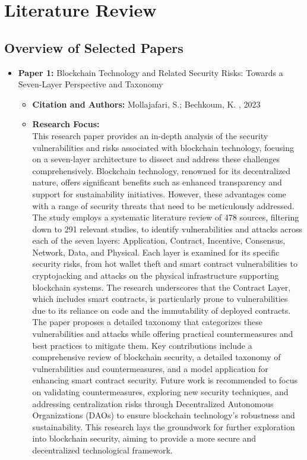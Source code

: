 \documentclass[12pt,a4paper]{article}
\begin{document}
\section{Literature Review}

\subsection{Overview of Selected Papers}
\begin{itemize}
    \item \textbf{Paper 1:} Blockchain Technology and Related Security Risks: Towards a Seven-Layer Perspective and Taxonomy
    \begin{itemize}
        \item \textbf{Citation and Authors:} Mollajafari, S.; Bechkoum, K. \cite{mollajafari_2023_blockchain}, 2023
        \item \textbf{Research Focus:} \\
This research paper provides an in-depth analysis of the security vulnerabilities and risks associated with blockchain technology, focusing on a seven-layer architecture to dissect and address these challenges comprehensively. Blockchain technology, renowned for its decentralized nature, offers significant benefits such as enhanced transparency and support for sustainability initiatives. However, these advantages come with a range of security threats that need to be meticulously addressed. The study employs a systematic literature review of 478 sources, filtering down to 291 relevant studies, to identify vulnerabilities and attacks across each of the seven layers: Application, Contract, Incentive, Consensus, Network, Data, and Physical. Each layer is examined for its specific security risks, from hot wallet theft and smart contract vulnerabilities to cryptojacking and attacks on the physical infrastructure supporting blockchain systems. The research underscores that the Contract Layer, which includes smart contracts, is particularly prone to vulnerabilities due to its reliance on code and the immutability of deployed contracts. The paper proposes a detailed taxonomy that categorizes these vulnerabilities and attacks while offering practical countermeasures and best practices to mitigate them. Key contributions include a comprehensive review of blockchain security, a detailed taxonomy of vulnerabilities and countermeasures, and a model application for enhancing smart contract security. Future work is recommended to focus on validating countermeasures, exploring new security techniques, and addressing centralization risks through Decentralized Autonomous Organizations (DAOs) to ensure blockchain technology's robustness and sustainability. This research lays the groundwork for further exploration into blockchain security, aiming to provide a more secure and decentralized technological framework.


\end{itemize}
\end{itemize}
\end{document}

